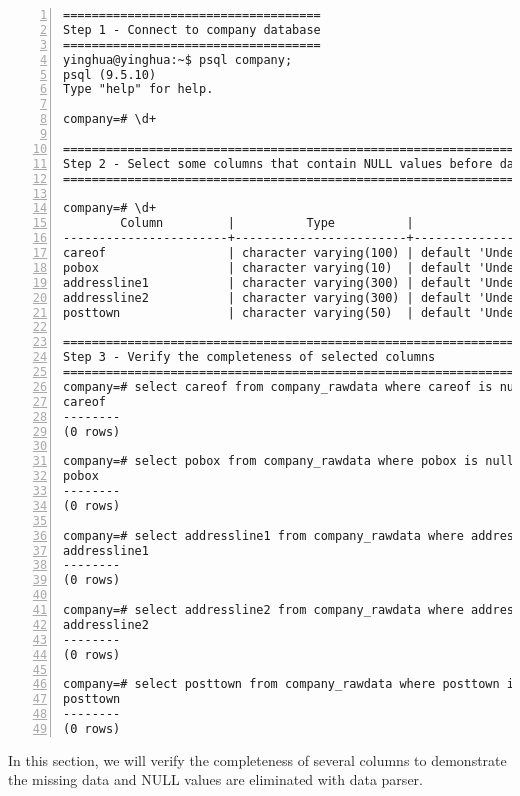 \lstset{basicstyle=\ttfamily\tiny}  
\begin{lstlisting}[breaklines, frame=single, numbers=left, caption={Import cleaned data into PostgreSQL database}, label=commandline-02]
====================================
Step 1 - Connect to company database
====================================
yinghua@yinghua:~$ psql company; 
psql (9.5.10)
Type "help" for help.

company=# \d+ 

============================================================================
Step 2 - Select some columns that contain NULL values before data is cleaned 
============================================================================

company=# \d+ 
        Column         |          Type          |                Modifiers                | Storage  | 
-----------------------+------------------------+-----------------------------------------+----------+
careof                 | character varying(100) | default 'Undefined'::character varying  | extended |
pobox                  | character varying(10)  | default 'Undefined'::character varying  | extended |
addressline1           | character varying(300) | default 'Undefined'::character varying  | extended |
addressline2           | character varying(300) | default 'Undefined'::character varying  | extended |
posttown               | character varying(50)  | default 'Undefined'::character varying  | extended |

============================================================================
Step 3 - Verify the completeness of selected columns 
============================================================================
company=# select careof from company_rawdata where careof is null; 
careof 
--------
(0 rows)

company=# select pobox from company_rawdata where pobox is null; 
pobox 
--------
(0 rows)

company=# select addressline1 from company_rawdata where addressline1 is null; 
addressline1 
--------
(0 rows)

company=# select addressline2 from company_rawdata where addressline2 is null; 
addressline2 
--------
(0 rows)

company=# select posttown from company_rawdata where posttown is null; 
posttown 
--------
(0 rows)

\end{lstlisting}

In this section, we will verify the completeness of several columns to demonstrate the missing data and NULL values are eliminated with data parser. 

\newpage



